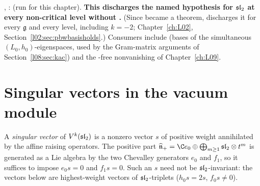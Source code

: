 \begin{status}
\allowbreak{}\allowbreak{},
\allowbreak{}\allowbreak{}\allowbreak{}: \lean{[propext, Classical.}\allowbreak{}\allowbreak\lean{sound]} (run for this chapter). \textbf{This discharges the named hypothesis 
for $\mathfrak{sl}_2$ at every non-critical level without .} (Since  became a theorem,
 discharges it for every $\mathfrak g$ and every level, including $k=-2$; Chapter~\ref{ch:L02},
Section~\ref{l02:sec:pbwbasisholds}.) Consumers include
 (bases of the simultaneous $(L_0,h_0)$-eigenspaces, used by the
Gram-matrix arguments of Section~\ref{l08:sec:kac}) and the -free nonvanishing
\allowbreak{}\allowbreak{}\allowbreak{} of Chapter~\ref{ch:L09}.
\end{status}
\section{Singular vectors in the vacuum module}\label{l08:sec:singular}

A \emph{singular vector} of $V^k(\mathfrak{sl}_2)$ is a nonzero vector $s$ of positive weight annihilated by
the affine raising operators. The positive part $\widehat{\mathfrak n}_+ = \C e_0\oplus\bigoplus_{m\ge1}
\leightsl\otimes t^m$ is generated as a Lie algebra by the two Chevalley generators $e_0$ and $f_1$, so it
suffices to impose $e_0s = 0$ and $f_1s=0$. Such an $s$ need not be $\mathfrak{sl}_2$-invariant: the vectors
below are highest-weight vectors of $\mathfrak{sl}_2$-triplets ($h_0s = 2s$, $f_0s\ne0$).

